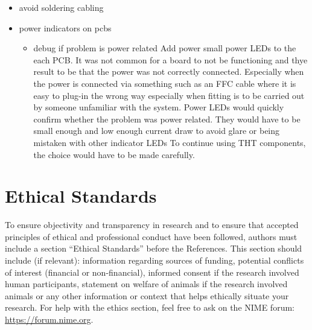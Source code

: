 \begin{itemize}
\item
  avoid soldering cabling
\item
  power indicators on pcbs

  \begin{itemize}
  \item
    debug if problem is power related Add power small power LEDs to the
    each PCB. It was not common for a board to not be functioning and
    thye result to be that the power was not correctly connected.
    Especially when the power is connected via something such as an FFC
    cable where it is easy to plug-in the wrong way especially when
    fitting is to be carried out by someone unfamiliar with the system.
    Power LEDs would quickly confirm whether the problem was power
    related. They would have to be small enough and low enough current
    draw to avoid glare or being mistaken with other indicator LEDs To
    continue using THT components, the choice would have to be made
    carefully.
  \end{itemize}
\end{itemize}



\section{Ethical Standards}\label{ethical-standards}

To ensure objectivity and transparency in research and to ensure that
accepted principles of ethical and professional conduct have been
followed, authors must include a section ``Ethical Standards'' before
the References. This section should include (if relevant): information
regarding sources of funding, potential conflicts of interest (financial
or non-financial), informed consent if the research involved human
participants, statement on welfare of animals if the research involved
animals or any other information or context that helps ethically situate
your research. For help with the ethics section, feel free to ask on the
NIME forum: \url{https://forum.nime.org}.






